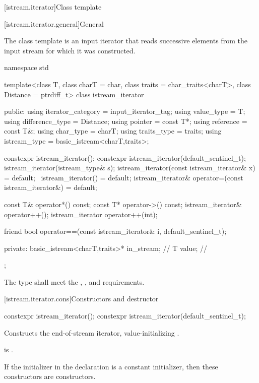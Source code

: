 [istream.iterator]{Class template }

[istream.iterator.general]{General}

\pnum
{}%
The class template 
is an input iterator that reads successive elements
from the input stream for which it was constructed.

\begin{codeblock}
namespace std {
  template<class T, class charT = char, class traits = char_traits<charT>,
           class Distance = ptrdiff_t>
  class istream_iterator {
  public:
    using iterator_category = input_iterator_tag;
    using value_type        = T;
    using difference_type   = Distance;
    using pointer           = const T*;
    using reference         = const T&;
    using char_type         = charT;
    using traits_type       = traits;
    using istream_type      = basic_istream<charT,traits>;

    constexpr istream_iterator();
    constexpr istream_iterator(default_sentinel_t);
    istream_iterator(istream_type& s);
    istream_iterator(const istream_iterator& x) = default;
    ~istream_iterator() = default;
    istream_iterator& operator=(const istream_iterator&) = default;

    const T& operator*() const;
    const T* operator->() const;
    istream_iterator& operator++();
    istream_iterator  operator++(int);

    friend bool operator==(const istream_iterator& i, default_sentinel_t);

  private:
    basic_istream<charT,traits>* in_stream; // \expos
    T value;                                // \expos
  };
}
\end{codeblock}

\pnum
The type  shall meet the ,
, and  requirements.

[istream.iterator.cons]{Constructors and destructor}

%
\begin{itemdecl}
constexpr istream_iterator();
constexpr istream_iterator(default_sentinel_t);
\end{itemdecl}

\begin{itemdescr}
\pnum
\effects
Constructs the end-of-stream iterator, value-initializing .

\pnum
\ensures
{} is .

\pnum
\remarks
If the initializer  in the declaration 
is a constant initializer,
then these constructors are  constructors.
\end{itemdescr}


